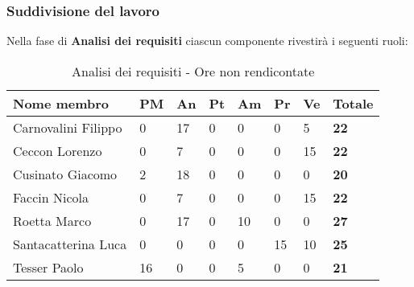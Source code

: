 		\subsubsection{Suddivisione del lavoro} %
		\label{ssub:suddivisione_del_lavoro}
		Nella fase di \textbf{Analisi dei requisiti} ciascun componente rivestirà i seguenti ruoli: \\
			\begin{table}[!h]
				\begin{center}
					\begin{tabularx}{0.9\textwidth}{|l|l|l|l|l|l|l|X|}
						\hline
						\textbf{Nome membro} & \textbf{PM} & \textbf{An} & \textbf{Pt} & \textbf{Am} & \textbf{Pr} & \textbf{Ve} & \textbf{Totale} \\
						\hline
						Carnovalini Filippo & 0 & 17 & 0 & 0 & 0 & 5 & \textbf{22} \\
						\hline
						Ceccon Lorenzo & 0 & 7 & 0 & 0 & 0 & 15 & \textbf{22} \\
						\hline
						Cusinato Giacomo & 2 & 18 & 0 & 0 & 0 & 0 & \textbf{20} \\
						\hline
						Faccin Nicola & 0 & 7 & 0 & 0 & 0 & 15 & \textbf{22} \\
						\hline
						Roetta Marco & 0 & 17 & 0 & 10 & 0 & 0 & \textbf{27} \\
						\hline
						Santacatterina Luca & 0 & 0 & 0 & 0 & 15 & 10 & \textbf{25} \\
						\hline
						Tesser Paolo & 16 & 0 & 0 & 5 & 0 & 0 & \textbf{21} \\
						\hline		
					\end{tabularx}
				\end{center}
			\caption{Analisi dei requisiti - Ore non rendicontate}
			\end{table}
		

